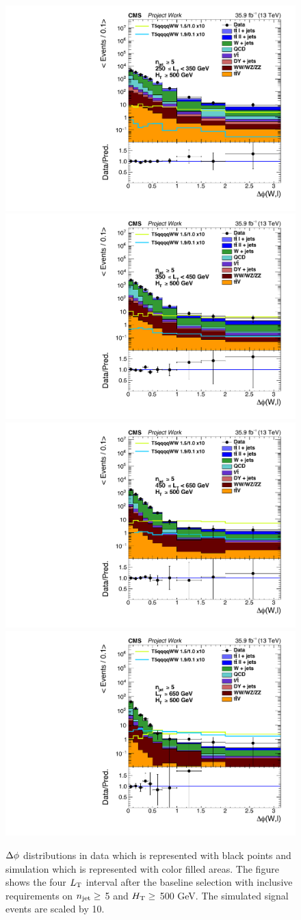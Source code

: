 \begin{figure}[!h]
\begin{center}
    \includegraphics[width=0.45 \textwidth]{Plots/analysis/results/deltaPhi_Wl_wideProject1}
    \includegraphics[width=0.45 \textwidth]{Plots/analysis/results/deltaPhi_Wl_wideProject2} \\
    \includegraphics[width=0.45 \textwidth]{Plots/analysis/results/deltaPhi_Wl_wideProject3}
    \includegraphics[width=0.45 \textwidth]{Plots/analysis/results/deltaPhi_Wl_wideProject4}
    \caption[The inclusive $\DF$ distributions]{$\DF$ distributions in data which is represented with black points and simulation which is represented with color filled areas. The figure shows the four $L_{\rm T}$ interval after the baseline selection with inclusive requirements on $n_{\rm jet}\geq$ 5 and $H_{\rm T}\geq$ 500 GeV. The simulated signal events are scaled by 10.
    }
    \label{fig:DFunblind}
\end{center}
\end{figure}
